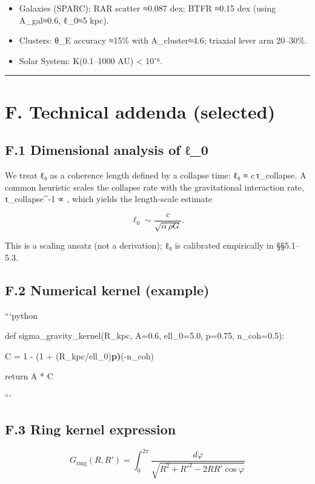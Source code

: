 \documentclass[11pt,a4paper]{article}
\begin{document}
\begin{itemize}
\item Galaxies (SPARC): RAR scatter ≈0.087 dex; BTFR ≈0.15 dex (using A\_gal≈0.6, ℓ\_0≈5 kpc).
\item Clusters: θ\_E accuracy ≈15\% with A\_cluster≈4.6; triaxial lever arm 20–30\%.
\item Solar System: K(0.1–1000 AU) < 10⁻⁶.
\end{itemize}


\medskip\hrule\medskip


\section{F. Technical addenda (selected)}


\subsection{F.1 Dimensional analysis of ℓ\_0}


We treat ℓ₀ as a coherence length defined by a collapse time: ℓ₀ ≡ c\,τ\_{\rm collapse}. A common heuristic scales the collapse rate with the gravitational interaction rate, τ\_{\rm collapse}^{-1} ∝ , which yields the length‑scale estimate

\begin{equation}
\ell_0 \sim \frac{c}{\sqrt{\alpha\,\rho G}}.
\end{equation}

This is a scaling ansatz (not a derivation); ℓ₀ is calibrated empirically in §§5.1–5.3.


\subsection{F.2 Numerical kernel (example)}


```python

def sigma\_gravity\_kernel(R\_kpc, A=0.6, ell\_0=5.0, p=0.75, n\_coh=0.5):

    C = 1 - (1 + (R\_kpc/ell\_0)\textbf{p)}(-n\_coh)

    return A * C

```


\subsection{F.3 Ring kernel expression}


\begin{equation}
G_{\mathrm{ring}}(R, R') = \int_{0}^{2\pi} \frac{d\varphi}{\sqrt{R^2 + R'^2 - 2 R R'\cos\varphi}}
\end{equation}
\end{document}
